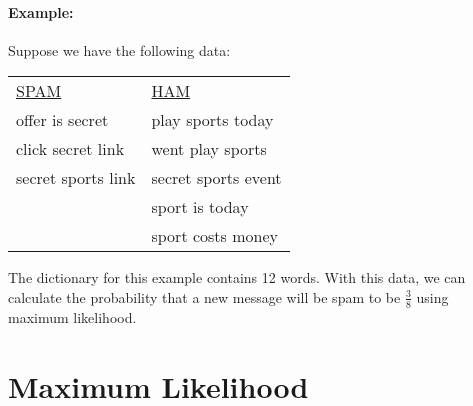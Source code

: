 \documentclass[10pt,a4paper]{article}
\begin{document}
\paragraph{Example:} Suppose we have the following data:
\begin{center}
\begin{tabular}{l l}
\quad \underline{SPAM} & \quad \underline{HAM} \\
offer is secret & play sports today \\
click secret link & went play sports \\
secret sports link & secret sports event \\
 & sport is today \\
 & sport costs money
\end{tabular}
\end{center}
The dictionary for this example contains 12 words. With this data, we can calculate the probability that a new message will be spam to be $\frac{3}{8}$ using maximum likelihood.

\section{Maximum Likelihood}
\end{document}
